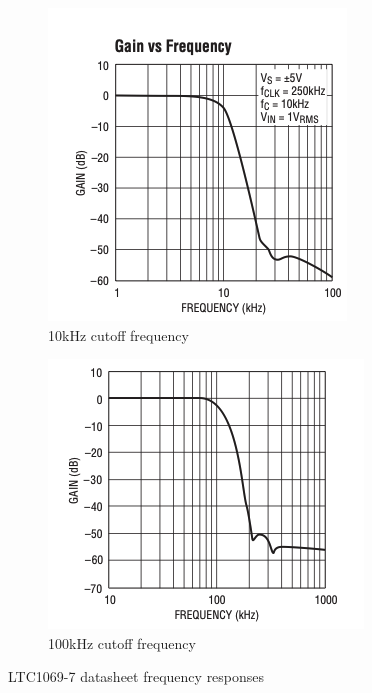 \begin{figure}[H]
    \centering
    \begin{subfigure}[b]{0.48\textwidth}
        \centering
        \includegraphics[width=\textwidth]{LTC_10k.png}
        \caption{10kHz cutoff frequency}
        \label{fig:ltc_10k}
    \end{subfigure}\hfill
    \begin{subfigure}[b]{0.48\textwidth}
        \centering
        \includegraphics[width=\textwidth]{LTC_100k.png}
        \caption{100kHz cutoff frequency}
        \label{fig:ltc_100k}
    \end{subfigure}
    \caption{LTC1069-7 datasheet frequency responses}
    \label{fig:ltc_aa_freq}
\end{figure}

